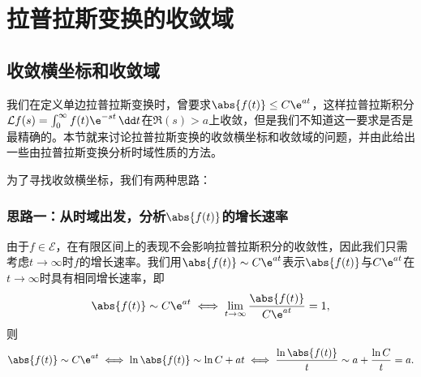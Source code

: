 \section{拉普拉斯变换的收敛域}\label{Convergence}

\subsection{收敛横坐标和收敛域}\label{sub:converge_abscissa}
我们在定义单边拉普拉斯变换时，曾要求$\abs{f(t)}\leq C\e^{at}$，这样拉普拉斯积分$\mathcal{L}f(s)=\int_{0}^{\infty}f(t)\e^{-st}\,\dd t$在$\Re(s)>a$上收敛，但是我们不知道这一要求是否是最精确的。本节就来讨论拉普拉斯变换的收敛横坐标和收敛域的问题，并由此给出一些由拉普拉斯变换分析时域性质的方法。

为了寻找收敛横坐标，我们有两种思路：

\subsubsection{思路一：从时域出发，分析$\abs{f(t)}$的增长速率}
由于$f\in\mathcal{E}$，在有限区间上的表现不会影响拉普拉斯积分的收敛性，因此我们只需考虑$t\to\infty$时$f$的增长速率。我们用$\abs{f(t)}\sim C\e^{at}$表示$\abs{f(t)}$与$C\e^{at}$在$t\to\infty$时具有相同增长速率，即
\begin{equation}
    \abs{f(t)}\sim C\e^{at}\iff\lim_{t\to\infty}\frac{\abs{f(t)}}{C\e^{at}}=1,
\end{equation}
则
\begin{equation}
    \abs{f(t)}\sim C\e^{at}\iff\ln\abs{f(t)}\sim\ln C+at\iff\frac{\ln\abs{f(t)}}{t}\sim a+\frac{\ln C}{t}=a.
\end{equation}

